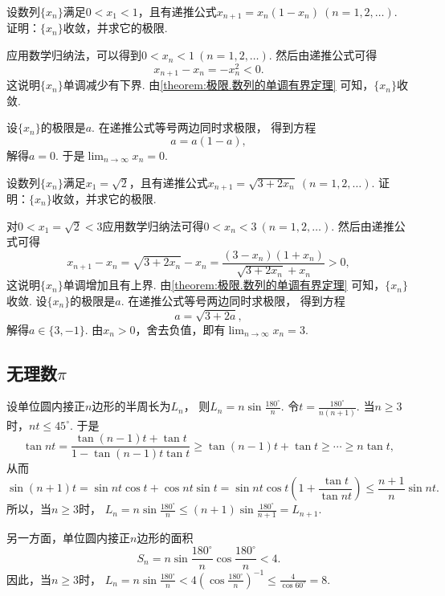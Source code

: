 \begin{example}
设数列\(\{x_n\}\)满足\(0<x_1<1\)，且有递推公式\(x_{n+1}=x_n(1-x_n)\ (n=1,2,\dotsc)\).
证明：\(\{x_n\}\)收敛，并求它的极限.
\begin{solution}
应用数学归纳法，可以得到\(0<x_n<1\ (n=1,2,\dotsc)\).
然后由递推公式可得\[
	x_{n+1}-x_n = -x_n^2 < 0.
\]
这说明\(\{x_n\}\)单调减少有下界.
由\cref{theorem:极限.数列的单调有界定理} 可知，\(\{x_n\}\)收敛.

设\(\{x_n\}\)的极限是\(a\).
在递推公式等号两边同时求极限，
得到方程\[
	a=a(1-a),
\]
解得\(a=0\).
于是\(\lim_{n\to\infty} x_n = 0\).
\end{solution}
\end{example}

\begin{example}
设数列\(\{x_n\}\)满足\(x_1=\sqrt2\)，且有递推公式\(x_{n+1}=\sqrt{3+2x_n}\ (n=1,2,\dotsc)\).
证明：\(\{x_n\}\)收敛，并求它的极限.
\begin{solution}
对\(0<x_1=\sqrt2<3\)应用数学归纳法可得\(0<x_n<3\ (n=1,2,\dotsc)\).
然后由递推公式可得\[
	x_{n+1}-x_n = \sqrt{3+2x_n} - x_n
	= \frac{(3-x_n)(1+x_n)}{\sqrt{3+2x_n}+x_n}
	> 0,
\]
这说明\(\{x_n\}\)单调增加且有上界.
由\cref{theorem:极限.数列的单调有界定理} 可知，\(\{x_n\}\)收敛.
设\(\{x_n\}\)的极限是\(a\).
在递推公式等号两边同时求极限，
得到方程\[
	a=\sqrt{3+2a},
\]
解得\(a\in\{3,-1\}\).
由\(x_n>0\)，舍去负值，即有\(\lim_{n\to\infty} x_n = 3\).
\end{solution}
\end{example}

\subsection{无理数\texorpdfstring{$\pi$}{\textpi}}\label{section:极限.无理数pi}
设单位圆内接正\(n\)边形的半周长为\(L_n\)，
则\(L_n = n \sin\frac{180^\circ}{n}\).
令\(t=\frac{180^\circ}{n(n+1)}\).
当\(n\geq3\)时，\(nt\leq45^\circ\).
于是\[
	\tan nt
	= \frac{\tan(n-1)t + \tan t}{1 - \tan(n-1)t \tan t}
	\geq \tan(n-1)t + \tan t
	\geq \dotsb \geq n \tan t,
\]
从而\[
	\sin(n+1)t = \sin nt \cos t + \cos nt \sin t
	= \sin nt \cos t \left(1 + \frac{\tan t}{\tan nt}\right)
	\leq \frac{n+1}n \sin nt.
\]
所以，当\(n\geq3\)时，
\(L_n = n \sin\frac{180^\circ}{n}
\leq (n+1) \sin\frac{180^\circ}{n+1} = L_{n+1}\).

另一方面，单位圆内接正\(n\)边形的面积\[
	S_n = n \sin\frac{180^\circ}{n} \cos\frac{180^\circ}{n} < 4.
\]
因此，当\(n\geq3\)时，
\(L_n = n \sin\frac{180^\circ}{n}
< 4 \left(\cos\frac{180^\circ}{n}\right)^{-1}
\leq \frac4{\cos60^\circ}
= 8\).

